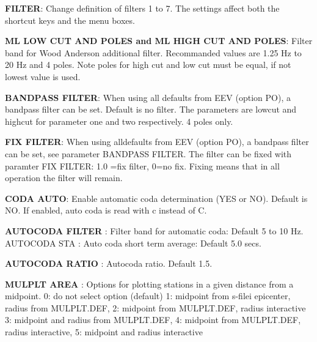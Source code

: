 \textbf{FILTER}: Change definition of filters 1 to 7. The settings affect both the shortcut keys and the menu boxes. 


\textbf{ML LOW CUT AND POLES and ML HIGH CUT AND POLES}: 
Filter band for Wood Anderson 
additional 
filter. Recommanded values are 1.25 Hz to 20 Hz and 4 poles. Note poles for high cut and low cut must be equal, if not lowest value is used. 

\textbf{BANDPASS FILTER}: When using all 
defaults from EEV (option PO), a bandpass filter can be set. Default is no filter. The parameters are 
lowcut and highcut for parameter one and two respectively. 4 poles only. 

\textbf{FIX FILTER}: When using alldefaults from EEV (option PO), a bandpass filter can be set, see parameter BANDPASS FILTER. The filter can be fixed with paramter FIX FILTER: 1.0 =fix filter, 0=no fix. Fixing means that in all operation the filter will remain.

\textbf{CODA AUTO}: Enable automatic coda determination (YES or NO). Default is NO. If enabled, auto coda is read with c instead of C. 

\textbf{AUTOCODA FILTER }: Filter band for automatic coda: Default 5 to 10 Hz. AUTOCODA STA : Auto coda short term average: Default 5.0 secs. 

\textbf{AUTOCODA RATIO }: Autocoda ratio. Default 1.5.

\textbf{MULPLT AREA }: Options for plotting stations in a given distance from a midpoint. 0: do not select option (default) 1: midpoint from s-filei epicenter, radius from MULPLT.DEF,  2: midpoint from MULPLT.DEF, radius interactive  3: midpoint and radius from MULPLT.DEF, 4: midpoint from MULPLT.DEF, radius interactive, 5: midpoint and radius interactive 

